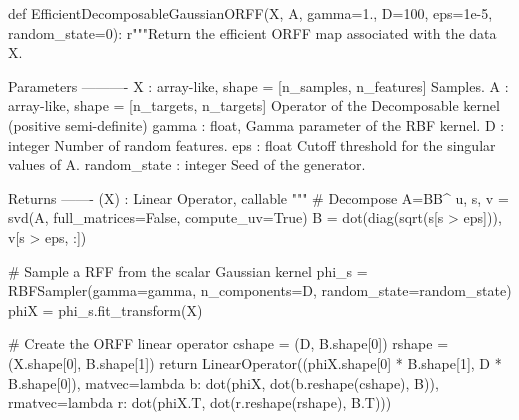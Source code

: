 \begin{pyblock}
def EfficientDecomposableGaussianORFF(X, A, gamma=1.,
                                      D=100, eps=1e-5, random_state=0):
    r"""Return the efficient ORFF map associated with the data X.

    Parameters
    ----------
    X : {array-like}, shape = [n_samples, n_features]
        Samples.
    A : {array-like}, shape = [n_targets, n_targets]
        Operator of the Decomposable kernel (positive semi-definite)
    gamma : {float},
        Gamma parameter of the RBF kernel.
    D : {integer}
        Number of random features.
    eps : {float}
        Cutoff threshold for the singular values of A.
    random_state : {integer}
        Seed of the generator.

    Returns
    -------
    \tilde{\Phi}(X) : Linear Operator, callable
    """
    # Decompose A=BB^\transpose
    u, s, v = svd(A, full_matrices=False, compute_uv=True)
    B = dot(diag(sqrt(s[s > eps])), v[s > eps, :])

    # Sample a RFF from the scalar Gaussian kernel
    phi_s = RBFSampler(gamma=gamma, n_components=D, random_state=random_state)
    phiX = phi_s.fit_transform(X)

    # Create the ORFF linear operator
    cshape = (D, B.shape[0])
    rshape = (X.shape[0], B.shape[1])
    return LinearOperator((phiX.shape[0] * B.shape[1], D * B.shape[0]),
                          matvec=lambda b: dot(phiX, dot(b.reshape(cshape),
                                               B)),
                          rmatvec=lambda r: dot(phiX.T, dot(r.reshape(rshape),
                                                B.T)))
\end{pyblock}

